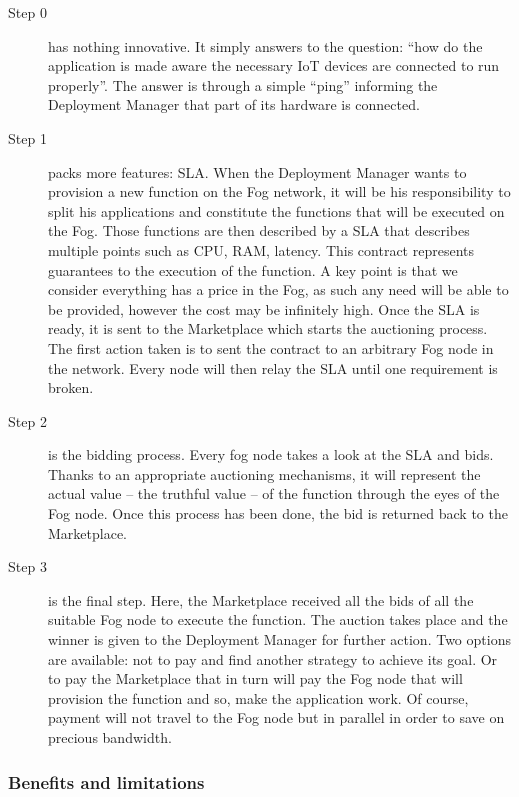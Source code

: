 \documentclass[11pt]{sdm}
\begin{document}
\begin{description}
	\item[Step 0]{has nothing innovative. It simply answers to the question: “how do the application is made aware the necessary \gls{IoT} devices are connected to run properly”. 
	The answer is through a simple “ping” informing the Deployment Manager that part of its hardware is connected.
	}
	\item[Step 1] {packs more features: \gls{SLA}. When the Deployment Manager wants to provision a new function on the Fog network, it will be his responsibility to split his applications and constitute the functions that will be executed on the Fog. Those functions are then described by a \gls{SLA} that describes multiple points such as CPU, RAM, latency. This contract represents guarantees to the execution of the function. A key point is that we consider everything has a price in the Fog, as such any need will be able to be provided, however the cost may be infinitely high.
	Once the \gls{SLA} is ready, it is sent to the Marketplace which starts the auctioning process. The first action taken is to sent the contract to an arbitrary Fog node in the network. Every node will then relay the \gls{SLA} until one requirement is broken.
	}
	\item[Step 2] {is the bidding process. Every fog node takes a look at the \gls{SLA} and bids. Thanks to an appropriate  auctioning mechanisms, it will represent the actual value – the truthful value – of the function through the eyes of the Fog node. Once this process has been done, the bid is returned back to the Marketplace.}
	\item[Step 3] {is the final step. Here, the Marketplace received all the bids of all the suitable Fog node to execute the function. The auction takes place and the winner is given to the Deployment Manager for further action. Two options are available: not to pay and find another strategy to achieve its goal. Or to pay the Marketplace that in turn will pay the Fog node that will provision the function and so, make the application work. Of course, payment will not travel to the Fog node but in parallel in order to save on precious bandwidth.}
				
\end{description}


\subsubsection{Benefits and limitations}
\end{document}
